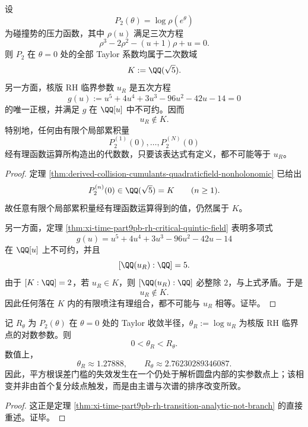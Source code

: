 \begin{theorem}[临界阈值对有限喷注的不可见性]\label{thm:conclusion-realinput40-rh-threshold-finite-jet-invisibility}
设
\[
P_2(\theta)=\log \rho(e^\theta)
\]
为碰撞势的压力函数，其中 \(\rho(u)\) 满足三次方程
\[
\rho^3-2\rho^2-(u+1)\rho+u=0.
\]
则 \(P_2\) 在 \(\theta=0\) 处的全部 Taylor 系数均属于二次数域
\[
K:=\QQ(\sqrt5).
\]
另一方面，核版 RH 临界参数 \(u_R\) 是五次方程
\[
g(u):=u^5+4u^4+3u^3-96u^2-42u-14=0
\]
的唯一正根，并满足 \(g\) 在 \(\QQ[u]\) 中不可约。因而
\[
u_R\notin K.
\]
特别地，任何由有限个局部累积量
\[
P_2^{(1)}(0),\dots,P_2^{(N)}(0)
\]
经有理函数运算所构造出的代数数，只要该表达式有定义，都不可能等于 \(u_R\)。
\end{theorem}
\begin{proof}
定理 \ref{thm:derived-collision-cumulants-quadraticfield-nonholonomic} 已给出
\[
P_2^{(n)}(0)\in \QQ(\sqrt5)=K
\qquad (n\ge 1).
\]
故任意有限个局部累积量经有理函数运算得到的值，仍然属于 \(K\)。

另一方面，定理 \ref{thm:xi-time-part9pb-rh-critical-quintic-field} 表明多项式
\[
g(u)=u^5+4u^4+3u^3-96u^2-42u-14
\]
在 \(\QQ[u]\) 上不可约，并且
\[
[\QQ(u_R):\QQ]=5.
\]
由于 \([K:\QQ]=2\)，若 \(u_R\in K\)，则 \([\QQ(u_R):\QQ]\) 必整除 \(2\)，与上式矛盾。于是
\[
u_R\notin K.
\]
因此任何落在 \(K\) 内的有限喷注有理组合，都不可能与 \(u_R\) 相等。证毕。
\end{proof}

\begin{proposition}[RH 相变先于解析边界]\label{prop:conclusion-realinput40-rh-transition-before-analytic-boundary}
记 \(R_\theta\) 为 \(P_2(\theta)\) 在 \(\theta=0\) 处的 Taylor 收敛半径，\(\theta_R:=\log u_R\) 为核版 RH 临界点的对数参数。则
\[
0<\theta_R<R_\theta.
\]
数值上，
\[
\theta_R\approx 1.27888,
\qquad
R_\theta\approx 2.76230289346087.
\]
因此，平方根误差门槛的失效发生在一个仍处于解析圆盘内部的实参数点上；该相变并非由首个复分歧点触发，而是由主谱与次谱的排序改变所致。
\end{proposition}
\begin{proof}
这正是定理 \ref{thm:xi-time-part9pb-rh-transition-analytic-not-branch} 的直接重述。证毕。
\end{proof}

